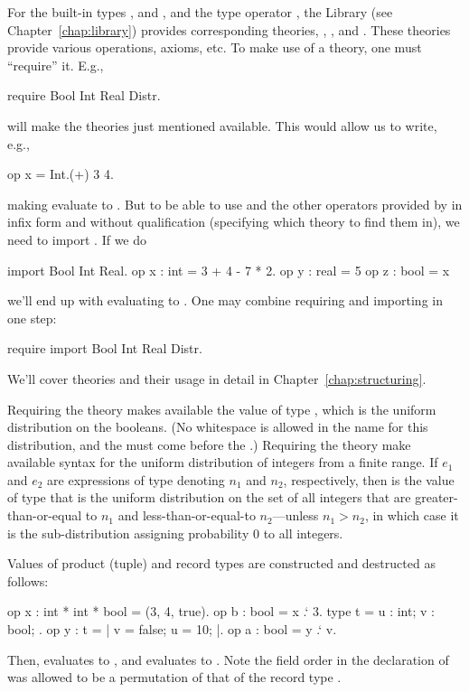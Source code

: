 For the built-in types ,  and , and the type
operator , the \EasyCrypt Library (see
Chapter~\ref{chap:library}) provides corresponding theories, ,
,  and . These theories provide various
operations, axioms, etc.  To make use of a theory, one must
``require'' it.  E.g.,
\begin{easycrypt}{}{}
require Bool Int Real Distr.
\end{easycrypt}
will make the theories just mentioned available. This
would allow us to write, e.g.,
\begin{easycrypt}{}{}
op x = Int.(+) 3 4.
\end{easycrypt}
making  evaluate to . But to be able to use \ec{+}
and the other operators provided by 
in infix form and without qualification (specifying which theory to
find them in), we need to import . If we do
\begin{easycrypt}{}{}
import Bool Int Real.
op x : int = 3 + 4 - 7 * 2.
op y : real = 5%
op z : bool = x%
\end{easycrypt}
we'll end up with  evaluating to .
One may combine requiring and importing in one step:
\begin{easycrypt}{}{}
require import Bool Int Real Distr.
\end{easycrypt}
We'll cover theories and their usage in detail in
Chapter~\ref{chap:structuring}.

Requiring the theory  makes available the value 
of type , which is the uniform distribution on
the booleans. (No whitespace is allowed in the name for this distribution,
and the  must come before the .)
Requiring the theory  make available syntax for the uniform
distribution of integers from a finite range. If $e_1$ and $e_2$
are expressions of type  denoting $n_1$ and $n_2$, respectively,
then \ec{[$e_1$..$e_2$]} is the value of type 
that is the uniform distribution on the set of
all integers that are greater-than-or-equal to $n_1$ and less-than-or-equal-to
$n_2$---unless $n_1>n_2$, in which case it is the sub-distribution assigning
probability $0$ to all integers.

Values of product (tuple) and record types are constructed and
destructed as follows:
\begin{easycrypt}{}{}
op x : int * int * bool = (3, 4, true).
op b : bool = x .` 3.
type t = { u : int; v : bool; }.
op y : t = {| v = false; u = 10; |}.
op a : bool = y .` v.
\end{easycrypt}
Then,  evaluates to , and  evaluates to .
Note the field order in the declaration of  was allowed to be
a permutation of that of the record type .

